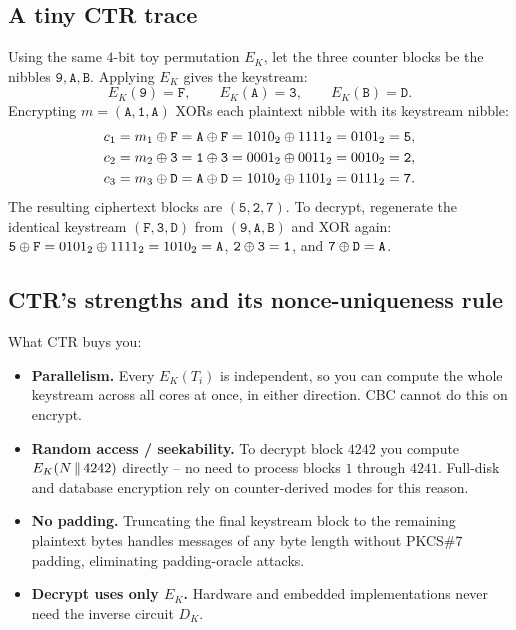\subsection{A tiny CTR trace}

Using the same $4$-bit toy permutation $E_K$, let the three counter blocks be the nibbles $\mathtt{9}, \mathtt{A}, \mathtt{B}$. Applying $E_K$ gives the keystream:
\[
E_K(\mathtt{9}) = \mathtt{F}, \qquad E_K(\mathtt{A}) = \mathtt{3}, \qquad E_K(\mathtt{B}) = \mathtt{D}.
\]
Encrypting $m = (\mathtt{A}, \mathtt{1}, \mathtt{A})$ XORs each plaintext nibble with its keystream nibble:
\begin{align*}
c_1 &= m_1 \oplus \mathtt{F} = \mathtt{A}\oplus\mathtt{F} = 1010_2 \oplus 1111_2 = 0101_2 = \mathtt{5},\\
c_2 &= m_2 \oplus \mathtt{3} = \mathtt{1}\oplus\mathtt{3} = 0001_2 \oplus 0011_2 = 0010_2 = \mathtt{2},\\
c_3 &= m_3 \oplus \mathtt{D} = \mathtt{A}\oplus\mathtt{D} = 1010_2 \oplus 1101_2 = 0111_2 = \mathtt{7}.
\end{align*}
The resulting ciphertext blocks are $(\mathtt{5},\mathtt{2},\mathtt{7})$. To decrypt, regenerate the identical keystream $(\mathtt{F},\mathtt{3},\mathtt{D})$ from $(\mathtt{9},\mathtt{A},\mathtt{B})$ and XOR again: $\mathtt{5}\oplus\mathtt{F} = 0101_2 \oplus 1111_2 = 1010_2 = \mathtt{A}$, $\mathtt{2}\oplus\mathtt{3} = \mathtt{1}$, and $\mathtt{7}\oplus\mathtt{D} = \mathtt{A}$.

\subsection{CTR's strengths and its nonce-uniqueness rule}

\begin{focusbox}
What CTR buys you:
\begin{itemize}
\item \textbf{Parallelism.} Every $E_K(T_i)$ is independent, so you can compute the whole keystream across all cores at once, in either direction. CBC cannot do this on encrypt.
\item \textbf{Random access / seekability.} To decrypt block $4242$ you compute $E_K(N \,\|\, 4242)$ directly -- no need to process blocks $1$ through $4241$. Full-disk and database encryption rely on counter-derived modes for this reason.
\item \textbf{No padding.} Truncating the final keystream block to the remaining plaintext bytes handles messages of any byte length without PKCS\#7 padding, eliminating padding-oracle attacks.
\item \textbf{Decrypt uses only $E_K$.} Hardware and embedded implementations never need the inverse circuit $D_K$.
\end{itemize}
\end{focusbox}


